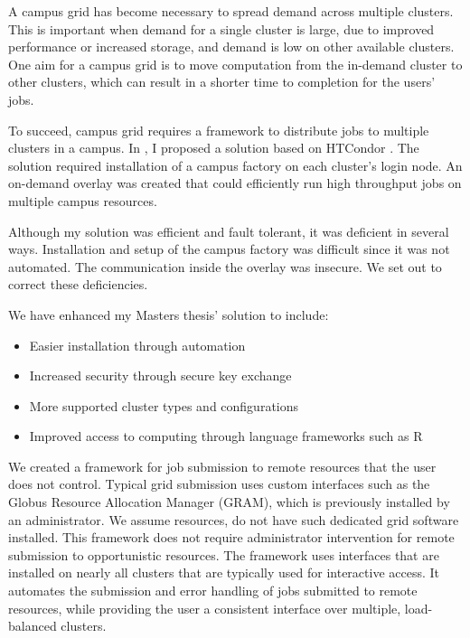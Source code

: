 A campus grid has become necessary to spread demand across multiple clusters.  This is important when demand for a single cluster is large, due to improved performance or increased storage, and demand is low on other available clusters.  One aim for a campus grid is to move computation from the in-demand cluster to other clusters, which can result in a shorter time to completion for the users' jobs.

To succeed, campus grid requires a framework to distribute jobs to multiple clusters in a campus.  In \cite{weitzel2011campus}, I proposed a solution based on HTCondor \cite{litzkow1988condor}.  The solution required installation of a campus factory \cite{website:campusfactory} on each cluster's login node.  An on-demand overlay was created that could efficiently run high throughput jobs on multiple campus resources.  

Although my solution was efficient and fault tolerant, it was deficient in several ways.  Installation and setup of the campus factory was difficult since it was not automated.  The communication inside the overlay was insecure.  We set out to correct these deficiencies.


We have enhanced my Masters thesis' solution to include:
\begin{itemize}
\item Easier installation through automation
\item Increased security through secure key exchange
\item More supported cluster types and configurations
\item Improved access to computing through language frameworks such as R \cite{team2005r}
\end{itemize}

We created a framework for job submission to remote resources that the user does not control.  Typical grid submission uses custom interfaces such as the Globus Resource Allocation Manager \cite{foster1999globus} (GRAM), which is previously installed by an administrator.  We assume resources,  do not have such dedicated grid software installed.  This framework does not require administrator intervention for remote submission to opportunistic resources.  The framework uses interfaces that are installed on nearly all clusters that are typically used for interactive access.  It automates the submission and error handling of jobs submitted to remote resources, while providing the user a consistent interface over multiple, load-balanced clusters.

